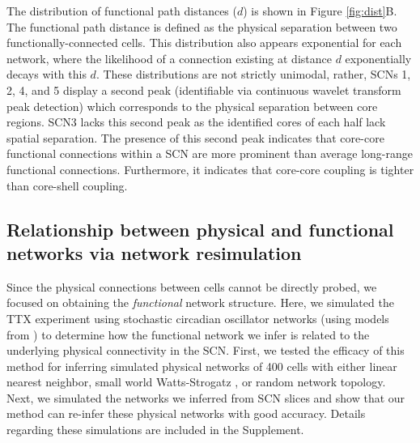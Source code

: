 The distribution of functional path distances ($d$) is shown in Figure \ref{fig:dist}B.
The functional path distance is defined as the physical separation between two functionally-connected cells.
This distribution also appears exponential for each network, where the likelihood of a connection existing at distance $d$ exponentially decays with this $d$.
These distributions are not strictly unimodal, rather, SCNs 1, 2, 4, and 5 display a second peak (identifiable via continuous wavelet transform peak detection) which corresponds to the physical separation between core regions.
SCN3 lacks this second peak as the identified cores of each half lack spatial separation.
The presence of this second peak indicates that core-core functional connections within a SCN are more prominent than average long-range functional connections.
Furthermore, it indicates that core-core coupling is tighter than core-shell coupling.


\subsection*{Relationship between physical and functional networks via network resimulation}

Since the physical connections between cells cannot be directly probed, we focused on obtaining the \textit{functional} network structure.
Here, we simulated the TTX experiment using stochastic circadian oscillator networks (using models from \cite{Gonze2006, Schroder2012, Abel2015a}) to determine how the functional network we infer is related to the underlying physical connectivity in the SCN.
First, we tested the efficacy of this method for inferring simulated physical networks of 400 cells with either linear nearest neighbor, small world Watts-Strogatz \cite{Watts1998}, or random network topology.
Next, we simulated the networks we inferred from SCN slices and show that our method can re-infer these physical networks with good accuracy.
Details regarding these simulations are included in the Supplement.

